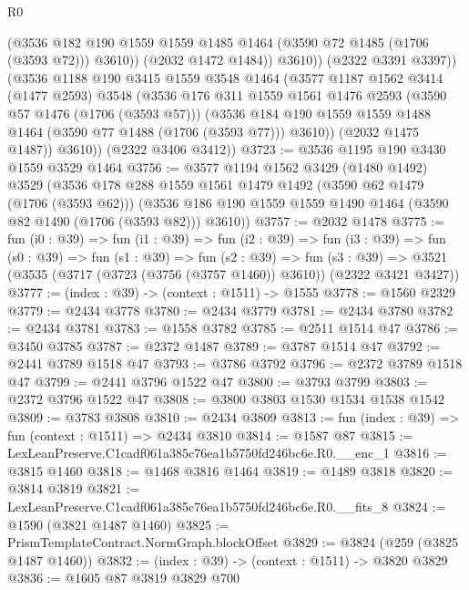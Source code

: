\begin{lexlean}{R0}
\begin{coremodule}
                  (@3536
                    @182
                    @190
                    @1559
                    @1559
                    @1485
                    @1464
                    (@3590 @72 @1485 (@1706 (@3593 @72)))
                    @3610))
                (@2032 @1472 @1484))
              @3610))
          (@2322 @3391 @3397))
        (@3536
          @1188
          @190
          @3415
          @1559
          @3548
          @1464
          (@3577
            @1187
            @1562
            @3414
            (@1477 @2593)
            @3548
            (@3536
              @176
              @311
              @1559
              @1561
              @1476
              @2593
              (@3590 @57 @1476 (@1706 (@3593 @57)))
              (@3536 @184 @190 @1559 @1559 @1488 @1464 (@3590 @77 @1488 (@1706 (@3593 @77))) @3610))
            (@2032 @1475 @1487))
          @3610))
      (@2322 @3406 @3412))
@3723 := @3536 @1195 @190 @3430 @1559 @3529 @1464
@3756 := @3577
    @1194
    @1562
    @3429
    (@1480 @1492)
    @3529
    (@3536
      @178
      @288
      @1559
      @1561
      @1479
      @1492
      (@3590 @62 @1479 (@1706 (@3593 @62)))
      (@3536 @186 @190 @1559 @1559 @1490 @1464 (@3590 @82 @1490 (@1706 (@3593 @82))) @3610))
@3757 := @2032 @1478
@3775 := fun (i0 : @39) =>
  fun (i1 : @39) =>
  fun (i2 : @39) =>
  fun (i3 : @39) =>
  fun (s0 : @39) =>
  fun (s1 : @39) =>
  fun (s2 : @39) =>
  fun (s3 : @39) => @3521 (@3535 (@3717 (@3723 (@3756 (@3757 @1460)) @3610)) (@2322 @3421 @3427))
@3777 := (index : @39) -> (context : @1511) -> @1555
@3778 := @1560 @2329
@3779 := @2434 @3778
@3780 := @2434 @3779
@3781 := @2434 @3780
@3782 := @2434 @3781
@3783 := @1558 @3782
@3785 := @2511 @1514 @47
@3786 := @3450 @3785
@3787 := @2372 @1487
@3789 := @3787 @1514 @47
@3792 := @2441 @3789 @1518 @47
@3793 := @3786 @3792
@3796 := @2372 @3789 @1518 @47
@3799 := @2441 @3796 @1522 @47
@3800 := @3793 @3799
@3803 := @2372 @3796 @1522 @47
@3808 := @3800 @3803 @1530 @1534 @1538 @1542
@3809 := @3783 @3808
@3810 := @2434 @3809
@3813 := fun (index : @39) => fun (context : @1511) => @2434 @3810
@3814 := @1587 @87
@3815 := LexLeanPreserve.C1cadf061a385c76ea1b5750fd246bc6e.R0.__enc_1
@3816 := @3815 @1460
@3818 := @1468 @3816 @1464
@3819 := @1489 @3818
@3820 := @3814 @3819
@3821 := LexLeanPreserve.C1cadf061a385c76ea1b5750fd246bc6e.R0.__fits_8
@3824 := @1590 (@3821 @1487 @1460)
@3825 := PrismTemplateContract.NormGraph.blockOffset
@3829 := @3824 (@259 (@3825 @1487 @1460))
@3832 := (index : @39) -> (context : @1511) -> @3820 @3829
@3836 := @1605 @87 @3819 @3829 @700

\end{coremodule}
\end{lexlean}
